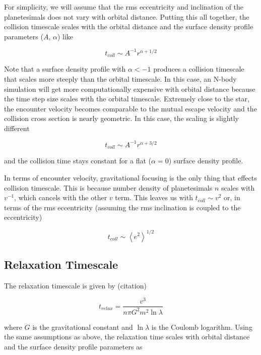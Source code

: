 \documentclass[onecolumn]{aastex63}
\begin{document}
\noindent For simplicity, we will assume that the rms eccentricity and inclination of the planetesimals does not vary with orbital distance. Putting this all together, the collision timescale scales with the orbital distance and the surface density profile parameters ($A$, $\alpha$) like

\begin{equation}
	t_{coll} \sim A^{-1} r^{\alpha + 1/2}
\end{equation}

Note that a surface density profile with $\alpha < -1$ produces a collision timescale that scales more steeply than the orbital timescale. In this case, an N-body simulation will get more computationally expensive with orbital distance because the time step size scales with the orbital timescale. Extremely close to the star, the encounter velocity becomes comparable to the mutual escape velocity and the collision cross section is nearly geometric. In this case, the scaling is slightly different

\begin{equation}
    t_{coll} \sim A^{-1} r^{\alpha + 3/2}
\end{equation}

\noindent and the collision time stays constant for a flat ($\alpha = 0$) surface density profile.

In terms of encounter velocity, gravitational focusing is the only thing that effects collision timescale. This is because number density of planetesimals $n$ scales with $v^{-1}$, which cancels with the other $v$ term. This leaves us with $t_{coll} \sim v^{2}$ or, in terms of the rms eccentricity (assuming the rms inclination is coupled to the eccentricity)

\begin{equation}
    t_{coll} \sim \left< e^{2} \right>^{1/2}
\end{equation}

\subsection{Relaxation Timescale}

The relaxation timescale is given by (citation)

\begin{equation}
    t_{relax} = \frac{v^3}{n \pi G^{2} m^{2} \ln \lambda}
\end{equation}

\noindent where $G$ is the gravitational constant and $\ln \lambda$ is the Coulomb logarithm. Using the same assumptions as above, the relaxation time scales with orbital distance and the surface density profile parameters as
\end{document}
